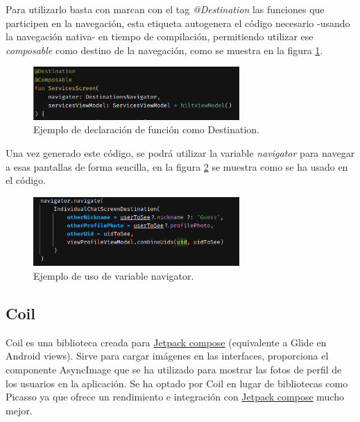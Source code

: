 Para utilizarlo basta con marcan con el tag \textit{@Destination} las funciones que participen en la navegación, esta etiqueta autogenera el código necesario -usando la navegación nativa- en tiempo de compilación, permitiendo utilizar ese \textit{composable} como destino de la navegación, como se muestra en la figura \ref{fig:ejemplo_destination}. 
\begin{figure}[h]
	\centering
	\includegraphics[width = 0.7\textwidth]{Imagenes/Fuentes/ejemplo_destination.png}
	\caption{Ejemplo de declaración de función como Destination.}
	\label{fig:ejemplo_destination}
\end{figure}

Una vez generado este código, se podrá utilizar la variable \textit{navigator} para navegar a esas pantallas de forma sencilla, en la figura \ref{fig:ejemplo_navigator} se muestra como se ha usado en el código. 
\begin{figure}[h]
	\centering
	\includegraphics[width = 0.7\textwidth]{Imagenes/Fuentes/ejemplo_navigator.png}
	\caption{Ejemplo de uso de variable navigator.}
	\label{fig:ejemplo_navigator}
\end{figure}

\hypertarget{subsec:coil}{}
\subsection{Coil} 
Coil\hyperlink{cap:biblio}{} es una biblioteca creada para \hyperlink{subsec:compose}{Jetpack compose} (equivalente a
Glide\hyperlink{cap:biblio}{} en Android views). Sirve para cargar imágenes en las interfaces, proporciona el componente AsyncImage que se ha utilizado para mostrar las fotos de perfil de los usuarios en la aplicación. Se ha optado por Coil en lugar de bibliotecas como 
Picasso\hyperlink{cap:biblio}{} ya que ofrece un rendimiento e integración con \hyperlink{subsec:compose}{Jetpack compose} mucho mejor. 

